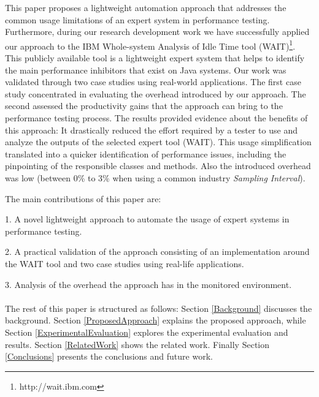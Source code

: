 \documentclass[runningheads,a4paper]{llncs}
\begin{document}
This paper proposes a lightweight automation approach that addresses the common
usage limitations of an expert system in performance testing. Furthermore,
during our research development work we have successfully applied our approach
to the IBM Whole-system Analysis of Idle Time tool (WAIT)\footnote{http://wait.ibm.com}. 
This publicly available tool is a lightweight expert system that helps to
identify the main performance inhibitors that exist on Java systems. Our work was 
validated through two case studies using real-world applications. The first case study 
concentrated in evaluating the overhead introduced by our approach. The second
assessed the productivity gains that the approach can bring to the
performance testing process. The results provided evidence about
the benefits of this approach: It drastically reduced the effort required by a
tester to use and analyze the outputs of the selected expert tool (WAIT). This
usage simplification translated into a quicker identification of performance issues, including the pinpointing of the
responsible classes and methods. Also the introduced overhead was low
(between 0\% to 3\% when using a common industry \emph{Sampling Interval}).

The main contributions of this paper are: 

1. A novel lightweight approach to automate the usage of expert systems in
performance testing.

2. A practical validation of the approach consisting of an implementation
around the WAIT tool and two case studies using real-life applications.

3. Analysis of the overhead the approach has in the monitored environment.
\\\\
The rest of this paper is structured as follows: Section \ref{Background}
discusses the background. Section \ref{ProposedApproach} explains the proposed approach, while Section
\ref{ExperimentalEvaluation} explores the experimental evaluation and results.
Section \ref{RelatedWork} shows the related work. Finally Section
\ref{Conclusions} presents the conclusions and future work.


\vspace{-5pt}
\end{document}
